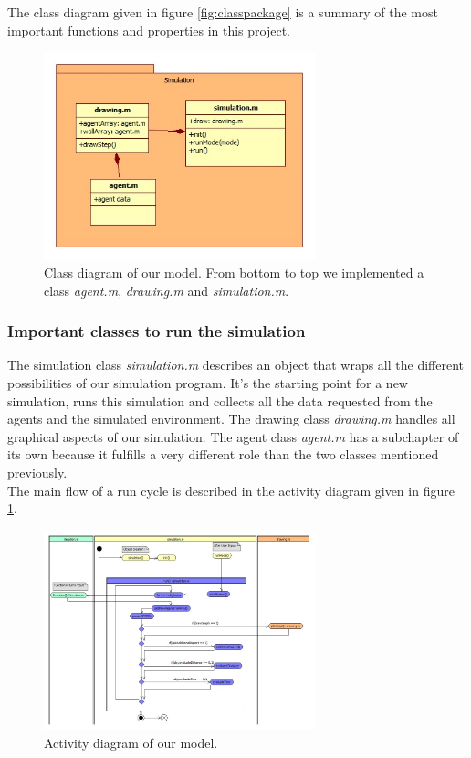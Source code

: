 \noi The class diagram given in figure \ref{fig:classpackage} is a summary of the most important functions and properties in this project.\\

\begin{figure}[h!]
	\centering
		\includegraphics[width=0.70\textwidth]{pictures/classpackage}
	\caption{Class diagram of our model. From bottom to top we implemented a class \textit{agent.m}, \textit{drawing.m} and \textit{simulation.m}.}
	
\end{figure}

\subsubsection{Important classes to run the simulation}
\noi The simulation class \textit{simulation.m} describes an object that wraps all the different possibilities of our simulation program. It's the starting point for a new simulation, runs this simulation and collects all the data requested from the agents and the simulated environment. The drawing class \textit{drawing.m} handles all graphical aspects of our simulation. The agent class \textit{agent.m} has a subchapter of its own because it fulfills a very different role than the two classes mentioned previously.\\
The main flow of a run cycle is described in the activity diagram given in figure \ref{fig:activityDiagram}.\\


\begin{figure}[h!]
	\centering
		\includegraphics[width=0.70\textwidth]{pictures/activityDiagram}
	\caption{Activity diagram of our model.}
	\label{fig:activityDiagram}
\end{figure}

